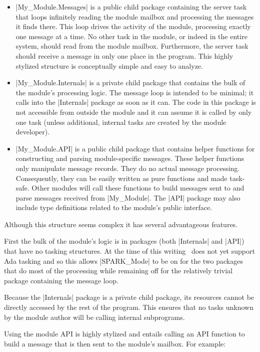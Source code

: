 \begin{itemize}
\item |My_Module.Messages| is a public child package containing the server task that loops
  infinitely reading the module mailbox and processing the messages it finds there. This loop
  drives the activity of the module, processing exactly one message at a time. No other task in
  the module, or indeed in the entire system, should read from the module mailbox. Furthermore,
  the server task should receive a message in only one place in the program. This highly
  stylized structure is conceptually simple and easy to analyze.

\item |My_Module.Internals| is a private child package that contains the bulk of the module's
  processing logic. The message loop is intended to be minimal; it calls into the |Internals|
  package as soon as it can. The code in this package is not accessible from outside the module
  and it can assume it is called by only one task (unless additional, internal tasks are created
  by the module developer).

\item |My_Module.API| is a public child package that contains helper functions for constructing
  and parsing module-specific messages. These helper functions only manipulate message records.
  They do no actual message processing. Consequently, they can be easily written as pure
  functions and made task-safe. Other modules will call these functions to build messages sent
  to and parse messages received from |My_Module|. The |API| package may also include type
  definitions related to the module's public interface.
\end{itemize}

Although this structure seems complex it has several advantageous features.

First the bulk of the module's logic is in packages (both |Internals| and |API|) that have no
tasking structures. At the time of this writing \SPARK\ does not yet support Ada tasking and so
this allows |SPARK_Mode| to be on for the two packages that do most of the processing while
remaining off for the relatively trivial package containing the message loop.

Because the |Internals| package is a private child package, its resources cannot be directly
accessed by the rest of the program. This ensures that no tasks unknown by the module author
will be calling internal subprograms.

Using the module API is highly stylized and entails calling an API function to build a message
that is then sent to the module's mailbox. For example:

